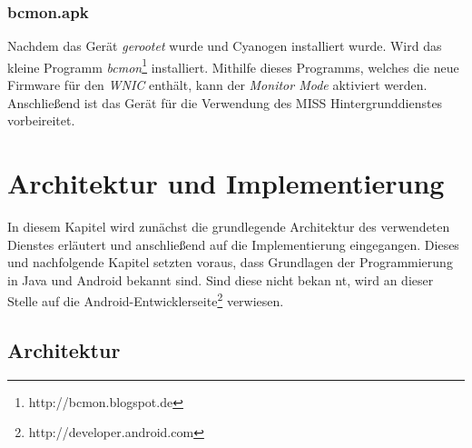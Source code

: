 \documentclass[]{report}
\begin{document}
\subsection{bcmon.apk}
Nachdem das Gerät \textit{gerootet} wurde und Cyanogen installiert wurde. Wird das kleine Programm \textit{bcmon}\footnote{http://bcmon.blogspot.de} installiert. Mithilfe dieses Programms, welches die neue Firmware für den \textit{WNIC} enthält, kann der \textit{Monitor Mode} aktiviert werden. Anschließend ist das Gerät für die Verwendung des MISS Hintergrunddienstes vorbeireitet. 
\chapter{Architektur und Implementierung}
In diesem Kapitel wird zunächst die grundlegende Architektur des verwendeten Dienstes erläutert und anschließend auf die Implementierung eingegangen. Dieses und nachfolgende Kapitel setzten voraus, dass Grundlagen der Programmierung in Java und Android bekannt sind. Sind diese nicht bekan  nt, wird an dieser Stelle auf die Android-Entwicklerseite\footnote{http://developer.android.com} verwiesen. 
\section{Architektur}
\end{document}
